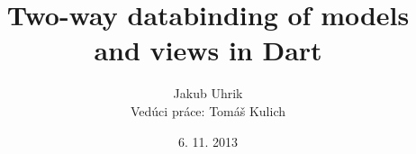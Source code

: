 \title[Two-way databinding of models and views in Dart]{Two-way databinding of models and views in Dart}
\author[Jakub Uhrik]{Jakub Uhrik\\[2\baselineskip]
Vedúci práce: Tomáš Kulich}
\date{6. 11. 2013}
